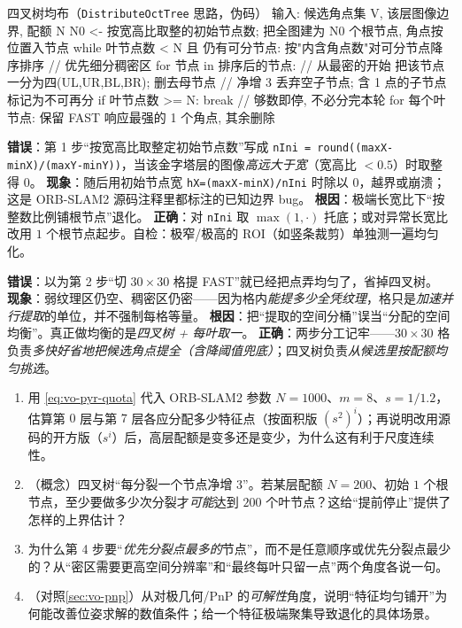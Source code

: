 \begin{codebox}[text]{四叉树均布（\texttt{DistributeOctTree} 思路，伪码）}
输入: 候选角点集 V, 该层图像边界, 配额 N
N0 <- 按宽高比取整的初始节点数;  把全图建为 N0 个根节点, 角点按位置入节点
while 叶节点数 < N 且 仍有可分节点:
    按"内含角点数"对可分节点降序排序            // 优先细分稠密区
    for 节点 in 排序后的节点:                    // 从最密的开始
        把该节点一分为四(UL,UR,BL,BR); 删去母节点  // 净增 3
        丢弃空子节点; 含 1 点的子节点标记为不可再分
        if 叶节点数 >= N: break                   // 够数即停, 不必分完本轮
for 每个叶节点:  保留 FAST 响应最强的 1 个角点, 其余删除
\end{codebox}

\begin{pitfall}
\textbf{错误}：第 1 步“按宽高比取整定初始节点数”写成 \texttt{nIni = round((maxX-minX)/\allowbreak (maxY-minY))}，当该金字塔层的图像\emph{高远大于宽}（宽高比 $<0.5$）时取整得 $0$。
\textbf{现象}：随后用初始节点宽 \texttt{hX=(maxX-minX)/\allowbreak nIni} 时除以 $0$，越界或崩溃；这是 ORB-SLAM2 源码注释里都标注的已知边界 bug。
\textbf{根因}：极端长宽比下“按整数比例铺根节点”退化。
\textbf{正确}：对 \texttt{nIni} 取 $\max(1,\cdot)$ 托底；或对异常长宽比改用 $1$ 个根节点起步。自检：极窄/极高的 ROI（如竖条裁剪）单独测一遍均匀化。
\end{pitfall}

\begin{pitfall}
\textbf{错误}：以为第 2 步“切 $30\times30$ 格提 FAST”就已经把点弄均匀了，省掉四叉树。
\textbf{现象}：弱纹理区仍空、稠密区仍密——因为格内\emph{能提多少全凭纹理}，格只是\emph{加速并行提取}的单位，并不强制每格等量。
\textbf{根因}：把“提取的空间分桶”误当“分配的空间均衡”。真正做均衡的是\emph{四叉树 + 每叶取一}。
\textbf{正确}：两步分工记牢——$30\times30$ 格负责\emph{多快好省地把候选角点提全（含降阈值兜底）}；四叉树负责\emph{从候选里按配额均匀挑选}。
\end{pitfall}

\begin{practice}
\begin{enumerate}
  \item 用 \cref{eq:vo-pyr-quota} 代入 ORB-SLAM2 参数 $N=1000$、$m=8$、$s=1/1.2$，估算第 $0$ 层与第 $7$ 层各应分配多少特征点（按面积版 $(s^2)^i$）；再说明改用源码的开方版（$s^i$）后，高层配额是变多还是变少，为什么这有利于尺度连续性。
  \item （概念）四叉树“每分裂一个节点净增 $3$”。若某层配额 $N=200$、初始 $1$ 个根节点，至少要做多少次分裂才\emph{可能}达到 $200$ 个叶节点？这给“提前停止”提供了怎样的上界估计？
  \item 为什么第 4 步要“\emph{优先分裂点最多的}节点”，而不是任意顺序或优先分裂点最少的？从“密区需要更高空间分辨率”和“最终每叶只留一点”两个角度各说一句。
  \item （对照\cref{sec:vo-pnp}）从对极几何/PnP 的\emph{可解性}角度，说明“特征均匀铺开”为何能改善位姿求解的数值条件；给一个特征极端聚集导致退化的具体场景。
\end{enumerate}
\end{practice}

